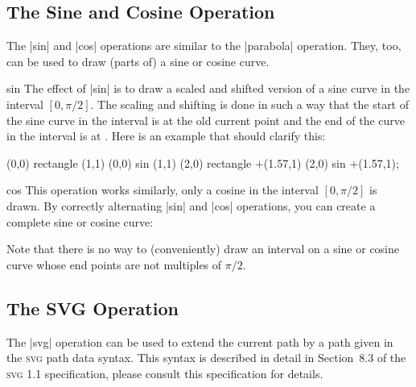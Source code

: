 \subsection{The Sine and Cosine Operation}

The |sin| and |cos| operations are similar to the |parabola| operation. They,
too, can be used to draw (parts of) a sine or cosine curve.

\begin{pathoperation}{sin}{}
    The effect of |sin| is to draw a scaled and shifted version of a sine curve
    in the interval $[0,\pi/2]$. The scaling and shifting is done in such a way
    that the start of the sine curve in the interval is at the old current
    point and the end of the curve in the interval is at
    . Here is an example that should clarify this:
\begin{codeexample}[]
\tikz \draw (0,0) rectangle (1,1)     (0,0) sin (1,1)
            (2,0) rectangle +(1.57,1) (2,0) sin +(1.57,1);
\end{codeexample}
\end{pathoperation}

\begin{pathoperation}{cos}{}
    This operation works similarly, only a cosine in the interval $[0,\pi/2]$
    is drawn. By correctly alternating |sin| and |cos| operations, you can
    create a complete sine or cosine curve:
\begin{codeexample}[]
\end{codeexample}
\end{pathoperation}

Note that there is no way to (conveniently) draw an interval on a sine or
cosine curve whose end points are not multiples of $\pi/2$.


\subsection{The SVG Operation}

The |svg| operation can be used to extend the current path by a path given in
the \textsc{svg} path data syntax. This syntax is described in detail in
Section~8.3 of the \textsc{svg 1.1} specification, please consult this
specification for details.

